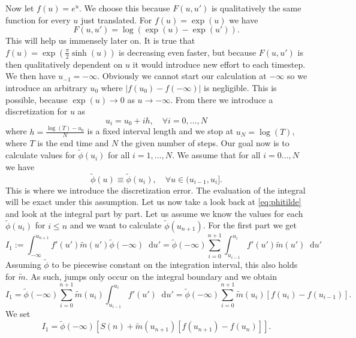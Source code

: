 \documentclass[12pt,a4paper,twoside, open=right]{scrreprt}
\theoremstyle{definition}
\theoremstyle{plain}
\newcommand{\abs}[1]{\left\vert #1\right\vert}
\newcommand{\D}{\mathop{}\!\mathrm{d}}
\begin{document}
Now let $f(u)=e^u$. We choose this because $F(u,u')$ is qualitatively the same function for every $u$ just translated. For $f(u)=\exp(u)$ we have
\begin{equation}
    F(u,u')=\log(\exp(u)-\exp(u')).
\end{equation}
This will help us immensely later on. It is true that $f(u)=\exp(\frac{\pi}{2}\sinh(u))$ is decreasing even faster, but because $F(u,u')$ is then qualitatively dependent on $u$ it would introduce new effort to each timestep. We then have $u_{-1}=-\infty$. Obviously we cannot start our calculation at $-\infty$ so we introduce an arbitrary $u_0$ where $\abs{f(u_0)-f(-\infty)}$ is negligible. This is possible, because $\exp(u)\to 0$ as $u\to-\infty$. From there we introduce a discretization for $u$ as
\begin{equation}
    u_i = u_0+ih,\quad\forall i=0,\dotsc,N
\end{equation}
where $h = \frac{\log(T) -u_0}{N}$ is a fixed interval length and we stop at $u_N=\log(T)$, where $T$ is the end time and $N$ the given number of steps. Our goal now is to calculate values for $\tilde\phi(u_i)$ for all $i=1,\dotsc,N$. We assume that for all $i=0\dotsc,N$ we have
\begin{equation}
    \tilde\phi(u) \equiv \tilde\phi(u_i), \quad\forall u\in(u_{i-1},u_i].
\end{equation}
This is where we introduce the discretization error. The evaluation of the integral will be exact under this assumption. Let us now take a look back at \eqref{eq:phitilde} and look at the integral part by part. Let us assume we know the values for each $\tilde\phi(u_i)$ for $i\le n$ and we want to calculate $\tilde\phi(u_{n+1})$. For the first part we get
\begin{equation}
    I_1:=\int_{-\infty}^{u_{n+1}}f'(u')\tilde{m}(u')\tilde\phi(-\infty)\D u'=\tilde\phi(-\infty)\sum_{i=0}^{n+1}\int_{u_{i-1}}^{u_i}f'(u')\tilde{m}(u')\D u'
\end{equation}
Assuming $\tilde{\phi}$ to be piecewise constant on the integration interval, this also holds for $\tilde{m}$. As such, jumps only occur on the integral boundary and we obtain
\begin{equation}
    I_1 = \tilde{\phi}(-\infty)\sum_{i=0}^{n+1}\tilde{m}(u_i)\int_{u_{i-1}}^{u_i}f'(u')\D u' = \tilde{\phi}(-\infty)\sum_{i=0}^{n+1}\tilde{m}(u_i)[f(u_i)-f(u_{i-1})].
\end{equation}
We set 
\begin{equation}
    I_1 = \tilde\phi(-\infty)[S(n)+\tilde{m}(u_{n+1})[f(u_{n+1})-f(u_n)]].
\end{equation}
\end{document}
